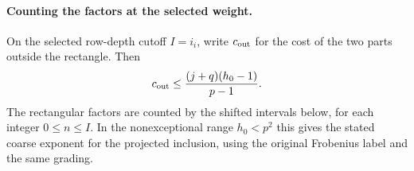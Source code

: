 \paragraph{Counting the factors at the selected weight.}
\begin{lemma}
\label{lem:selected-pieri-depth}
On the selected row-depth cutoff \(I=i_i\), write \(c_{\rm out}\) for the cost of the two parts outside the rectangle. Then
\[
 c_{\rm out}\le\frac{(j+q)(h_0-1)}{p-1}.
\] The rectangular factors are counted by
the shifted intervals below, for each integer \(0\le n\le I\).
In the nonexceptional range \(h_0<p^2\) this gives the stated
coarse exponent for the projected inclusion, using the original
Frobenius label and the same grading.
\end{lemma}

